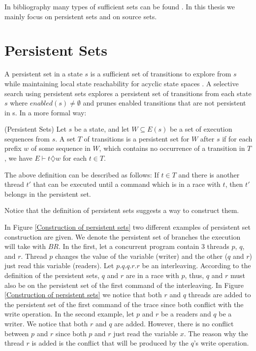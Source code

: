 In bibliography many types of sufficient sets can be found \cite{Godefroid1996}. 
In this thesis we mainly focus on persistent sets and on source sets.


\section{Persistent Sets}

A persistent set in a state $s$ is a sufficient set of transitions to
explore from $s$ while maintaining local state reachability for acyclic state spaces \cite{God97}. A selective search using persistent
sets explores a persistent set of transitions from each state $s$ where $enabled(s) \neq \emptyset$ and prunes enabled transitions that
are not persistent in s.
In a more formal way:\\

\begin{definition}{(Persistent Sets)}
Let $s$ be a state, and let $W \subseteq E(s)$ be a set
of execution sequences from $s$. A set $T$ of transitions is a persistent set for $W$
after $s$ if for each prefix $w$ of some sequence in $W$, which contains no occurrence
of a transition in $T$,  we have $E \vdash t \diamondsuit w$ for each $t \in T$.
\end{definition}

The above definition can be described as follows: If $t \in T$ and there is another thread $t'$ that can be executed until a command which
is in a race with $t$, then $t'$ belongs in the persistent set.

Notice that the definition of persistent sets suggests a way to construct them.

In Figure \ref{Construction of persistent sets} two different examples of persistent set construction are given. We denote the persistent set of branches the execution will take with $BR{}$.
In the first, let a concurrent program contain 3 threads $p$, $q$, and $r$. Thread $p$ changes the value of the variable (writer) and the other ($q$ and $r$) just read this variable (readers).
Let $p.q.q.r.r$ be an interleaving. According to the definition of the persistent sets, $q$ and $r$ are in a race with $p$, thus, $q$ and $r$ must also be on the persistent set
of the first command of the interleaving. In Figure \ref{Construction of persistent sets} we notice that both $r$ and $q$ threads are added to the persistent set of the first
command of the trace since both conflict with the write operation. 
In the second example, let $p$ and $r$  be a readers and $q$ be a writer. We notice that both $r$ and $q$ are added. However, there is no conflict between $p$ and $r$ since both $p$ and $r$
just read the variable $x$. The reason why the thread $r$ is added is the conflict that will be produced by the $q$'s write operation.

